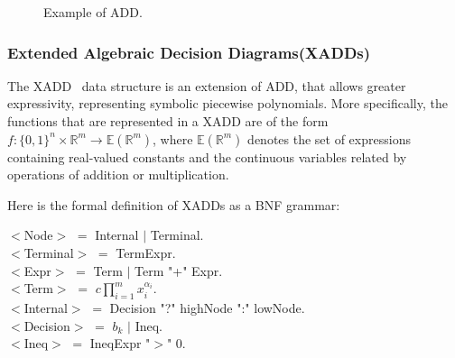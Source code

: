 \begin{figure}[h!t]
\center
{}
\caption{ Example of ADD.}
\label{fig:addapprox} 
\end{figure}


\subsubsection{Extended Algebraic Decision Diagrams(XADDs)} 

The XADD~\cite{sanner_uai11} data structure is an extension of ADD, that allows greater expressivity, representing symbolic piecewise polynomials. More specifically, the functions that are represented in a XADD are of the form $f : \{ 0, 1\}^n\times \mathbb{R}^m \rightarrow \mathbb{E}(\mathbb{R}^m)$, where $\mathbb{E}(\mathbb{R}^m)$ denotes the set of expressions containing real-valued constants and the continuous variables related by operations of addition or multiplication.

Here is the formal definition of XADDs as a BNF grammar:

$<$Node$>$ $=$ Internal $|$ Terminal.\\
$<$Terminal$>$ $=$ TermExpr.\\
$<$Expr$>$ $=$ Term $|$ Term "+" Expr.\\
$<$Term$>$ $=$ $c \prod_{i=1}^m {x_i^{\alpha_i }}$.\\
$<$Internal$>$ $=$ Decision "?" highNode  ":" lowNode.\\
$<$Decision$>$ $=$ $b_k$ $|$ Ineq.\\
$<$Ineq$>$ $=$ IneqExpr "$>$" 0.\\

